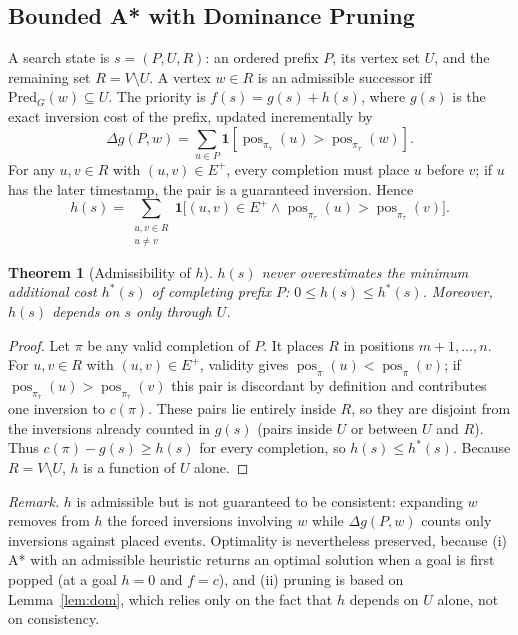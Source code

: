 \documentclass{ieeeaccess}
\newtheorem{theorem}{Theorem}
\DeclareMathOperator{\pos}{pos}
\newcommand{\ind}{\mathbf{1}}
\begin{document}
\subsection{Bounded A* with Dominance Pruning}
A search state is $s=(P,U,R)$: an ordered prefix $P$, its vertex set $U$, and the remaining set $R=V\setminus U$. A vertex $w\in R$ is an admissible successor iff $\mathrm{Pred}_G(w)\subseteq U$. The priority is $f(s)=g(s)+h(s)$, where $g(s)$ is the exact inversion cost of the prefix, updated incrementally by
\begin{equation}
\Delta g(P,w)=\sum_{u\in P}\ind[\pos_{\pi_\tau}(u)>\pos_{\pi_\tau}(w)].
\end{equation}
For any $u,v\in R$ with $(u,v)\in E^+$, every completion must place $u$ before $v$; if $u$ has the later timestamp, the pair is a guaranteed inversion. Hence
\begin{equation}
h(s)=\sum_{\substack{u,v\in R\\ u\neq v}}\ind\big[(u,v)\in E^+\wedge\pos_{\pi_\tau}(u)>\pos_{\pi_\tau}(v)\big].
\end{equation}

\begin{theorem}[Admissibility of $h$]\label{thm:adm}
$h(s)$ never overestimates the minimum additional cost $h^*(s)$ of completing prefix $P$: $0\le h(s)\le h^*(s)$. Moreover, $h(s)$ depends on $s$ only through $U$.
\end{theorem}
\begin{proof}
Let $\pi$ be any valid completion of $P$. It places $R$ in positions $m+1,\dots,n$. For $u,v\in R$ with $(u,v)\in E^+$, validity gives $\pos_\pi(u)<\pos_\pi(v)$; if $\pos_{\pi_\tau}(u)>\pos_{\pi_\tau}(v)$ this pair is discordant by definition and contributes one inversion to $c(\pi)$. These pairs lie entirely inside $R$, so they are disjoint from the inversions already counted in $g(s)$ (pairs inside $U$ or between $U$ and $R$). Thus $c(\pi)-g(s)\ge h(s)$ for every completion, so $h(s)\le h^*(s)$. Because $R=V\setminus U$, $h$ is a function of $U$ alone.
\end{proof}

\emph{Remark.} $h$ is admissible but is not guaranteed to be consistent: expanding $w$ removes from $h$ the forced inversions involving $w$ while $\Delta g(P,w)$ counts only inversions against placed events. Optimality is nevertheless preserved, because (i) A* with an admissible heuristic returns an optimal solution when a goal is first popped (at a goal $h=0$ and $f=c$), and (ii) pruning is based on Lemma~\ref{lem:dom}, which relies only on the fact that $h$ depends on $U$ alone, not on consistency.
\end{document}
